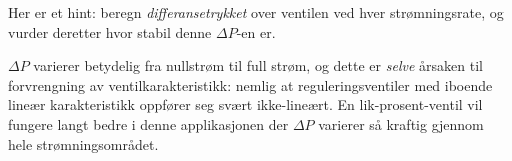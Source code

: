 
Her er et hint: beregn {\it differansetrykket} over ventilen ved hver strømningsrate, og vurder deretter hvor stabil denne $\Delta P$-en er.







$\Delta P$ varierer betydelig fra nullstrøm til full strøm, og dette er {\it selve} årsaken til forvrengning av ventilkarakteristikk: nemlig at reguleringsventiler med iboende lineær karakteristikk oppfører seg svært ikke-lineært. En lik-prosent-ventil vil fungere langt bedre i denne applikasjonen der $\Delta P$ varierer så kraftig gjennom hele strømningsområdet.




